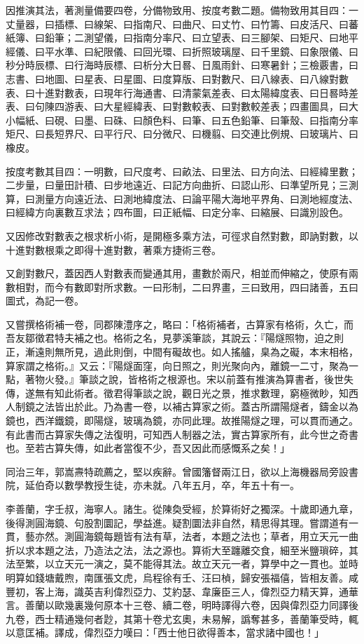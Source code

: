 \begin{pinyinscope}
因推演其法，著測量備要四卷，分備物致用、按度考數二題。備物致用其目四：一丈量器，曰插標、曰線架、曰指南尺、曰曲尺、曰丈竹、曰竹籌、曰皮活尺、曰蕃紙簿、曰鉛筆；二測望儀，曰指南分率尺、曰立望表、曰三腳架、曰矩尺、曰地平經儀、曰平水準、曰紀限儀、曰回光環、曰折照玻璃屋、曰千里鏡、曰象限儀、曰秒分時辰標、曰行海時辰標、曰析分大日晷、日風雨針、曰寒暑針；三檢覈書，曰志書、曰地圖、曰星表、曰星圖、曰度算版、曰對數尺、曰八線表、曰八線對數表、曰十進對數表，曰現年行海通書、曰清蒙氣差表、曰太陽緯度表、曰日晷時差表、曰句陳四游表、曰大星經緯表、曰對數較表、曰對數較差表；四畫圖具，曰大小幅紙、曰硯、曰墨、曰硃、曰顏色料、曰筆、曰五色鉛筆、曰筆殼、曰指南分率矩尺、曰長短界尺、曰平行尺、曰分微尺、曰機翦、曰交連比例規、曰玻璃片、曰橡皮。

按度考數其目四：一明數，曰尺度考、曰畝法、曰里法、曰方向法、曰經緯里數；二步量，曰量田計積、曰步地遠近、曰記方向曲折、曰認山形、曰準望所見；三測算，曰測量方向遠近法、曰測地緯度法、曰論平陽大海地平界角、曰測地經度法、曰經緯方向裏數互求法；四布圖，曰正紙幅、曰定分率、曰縮展、曰識別設色。

又因修改對數表之根求析小術，是開極多乘方法，可徑求自然對數，即訥對數，以十進對數根乘之即得十進對數，著乘方捷術三卷。

又創對數尺，蓋因西人對數表而變通其用，畫數於兩尺，相並而伸縮之，使原有兩數相對，而今有數即對所求數。一曰形制，二曰界畫，三曰致用，四曰諸善，五曰圖式，為記一卷。

又嘗撰格術補一卷，同郡陳澧序之，略曰：「格術補者，古算家有格術，久亡，而吾友鄒徵君特夫補之也。格術之名，見夢溪筆談，其說云：『陽燧照物，迫之則正，漸遠則無所見，過此則倒，中間有礙故也。如人搖艫，臬為之礙，本末相格，算家謂之格術。』又云：『陽燧面窪，向日照之，則光聚向內，離鏡一二寸，聚為一點，著物火發。』筆談之說，皆格術之根源也。宋以前蓋有推演為算書者，後世失傳，遂無有知此術者。徵君得筆談之說，觀日光之景，推求數理，窮極微眇，知西人制鏡之法皆出於此。乃為書一卷，以補古算家之術。蓋古所謂陽燧者，鑄金以為鏡也，西洋鐵鏡，即陽燧，玻璃為鏡，亦同此理。故推陽燧之理，可以貫而通之。有此書而古算家失傳之法復明，可知西人制器之法，實古算家所有，此今世之奇書也。至若古算失傳，如此者當復不少，吾又因此而感慨系之矣！」

同治三年，郭嵩燾特疏薦之，堅以疾辭。曾國籓督兩江日，欲以上海機器局旁設書院，延伯奇以數學教授生徒，亦未就。八年五月，卒，年五十有一。

李善蘭，字壬叔，海寧人。諸生。從陳奐受經，於算術好之獨深。十歲即通九章，後得測圓海鏡、句股割圜記，學益進。疑割圜法非自然，精思得其理。嘗謂道有一貫，藝亦然。測圓海鏡每題皆有法有草，法者，本題之法也；草者，用立天元一曲折以求本題之法，乃造法之法，法之源也。算術大至躔離交食，細至米鹽瑣碎，其法至繁，以立天元一演之，莫不能得其法。故立天元一者，算學中之一貫也。並時明算如錢塘戴煦，南匯張文虎，烏程徐有壬、汪曰楨，歸安張福僖，皆相友善。咸豐初，客上海，識英吉利偉烈亞力、艾約瑟、韋廉臣三人，偉烈亞力精天算，通華言。善蘭以歐幾裏幾何原本十三卷、續二卷，明時譯得六卷，因與偉烈亞力同譯後九卷，西士精通幾何者尟，其第十卷尤玄奧，未易解，譌奪甚多，善蘭筆受時，輒以意匡補。譯成，偉烈亞力嘆曰：「西士他日欲得善本，當求諸中國也！」


\end{pinyinscope}
